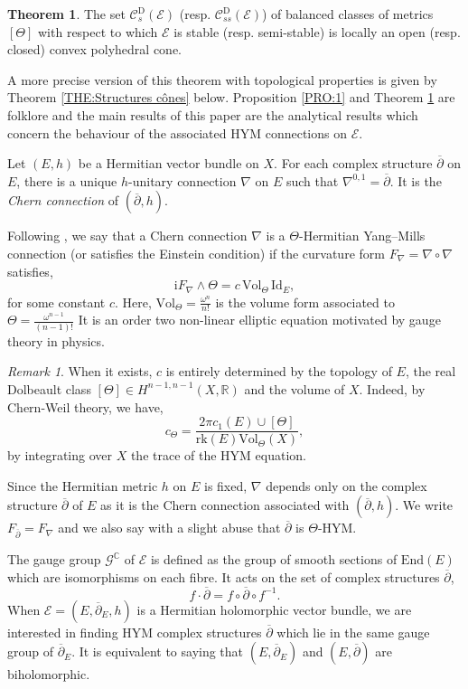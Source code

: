 \documentclass{article}
\theoremstyle{remark}
\newtheorem*{remark}{Remark}
\theoremstyle{definition}
\newtheorem{theoremIntro}{Theorem}
\newcommand{\R}{\mathbb{R}}
\newcommand{\C}{\mathbb{C}}
\newcommand{\rk}{\mathrm{rk}}
\newcommand{\End}{\mathrm{End}}
\newcommand{\Vol}{\mathrm{Vol}}
\newcommand{\Id}{\mathrm{Id}}
\renewcommand{\i}{\boldsymbol{\mathrm{i}}}
\newcommand{\E}{\mathcal{E}}
\newcommand{\G}{\mathcal{G}}
\newcommand{\dbar}{\overline{\partial}}
\newcommand{\mC}{\mathcal{C}}
\begin{document}
\begin{theoremIntro}\label{THE:2}
    The set $\mC_s^{\mathrm{D}}(\E)$ (resp. $\mC_{ss}^{\mathrm{D}}(\E)$) of balanced classes of metrics $[\Theta]$ with respect to which $\E$ is stable (resp. semi-stable) is locally an open (resp. closed) convex polyhedral cone.
\end{theoremIntro}

A more precise version of this theorem with topological properties is given by Theorem \ref{THE:Structures cônes} below. Proposition \ref{PRO:1} and Theorem \ref{THE:2} are folklore and the main results of this paper are the analytical results which concern the behaviour of the associated HYM connections on $\E$.

Let $(E,h)$ be a Hermitian vector bundle on $X$. For each complex structure $\dbar$ on $E$, there is a unique $h$-unitary connection $\nabla$ on $E$ such that $\nabla^{0,1} = \dbar$. It is the \textit{Chern connection} of $(\dbar,h)$.

Following \cite[Section 4.1]{Kobayashi}, we say that a Chern connection $\nabla$ is a $\Theta$-Hermitian Yang--Mills connection (or satisfies the Einstein condition) if the curvature form $F_\nabla = \nabla \circ \nabla$ satisfies,
$$
\i F_\nabla \wedge \Theta = c\,\Vol_\Theta\,\Id_E,
$$
for some constant $c$. Here, $\Vol_\Theta = \frac{\omega^n}{n!}$ is the volume form associated to $\Theta = \frac{\omega^{n - 1}}{(n - 1)!}$ It is an order two non-linear elliptic equation motivated by gauge theory in physics.

\begin{remark}\label{REM:Formule c}
When it exists, $c$ is entirely determined by the topology of $E$, the real Dolbeault class $[\Theta] \in H^{n - 1,n - 1}(X,\R)$ and the volume of $X$. Indeed, by Chern-Weil theory, we have,
$$
c_\Theta = \frac{2\pi c_1(E) \cup [\Theta]}{\rk(E)\Vol_\Theta(X)},
$$
by integrating over $X$ the trace of the HYM equation.
\end{remark}
Since the Hermitian metric $h$ on $E$ is fixed, $\nabla$ depends only on the complex structure $\dbar$ of $E$ as it is the Chern connection associated with $(\dbar,h)$. We write $F_{\dbar} = F_\nabla$ and we also say with a slight abuse that $\dbar$ is $\Theta$-HYM.

The gauge group $\G^\C$ of $\E$ is defined as the group of smooth sections of $\End(E)$ which are isomorphisms on each fibre. It acts on the set of complex structures $\dbar$,
$$
f \cdot \dbar = f \circ \dbar \circ f^{-1}.
$$
When $\E = (E,\dbar_E,h)$ is a Hermitian holomorphic vector bundle, we are interested in finding HYM complex structures $\dbar$ which lie in the same gauge group of $\dbar_E$. It is equivalent to saying that $(E,\dbar_E)$ and $(E,\dbar)$ are biholomorphic.
\end{document}
